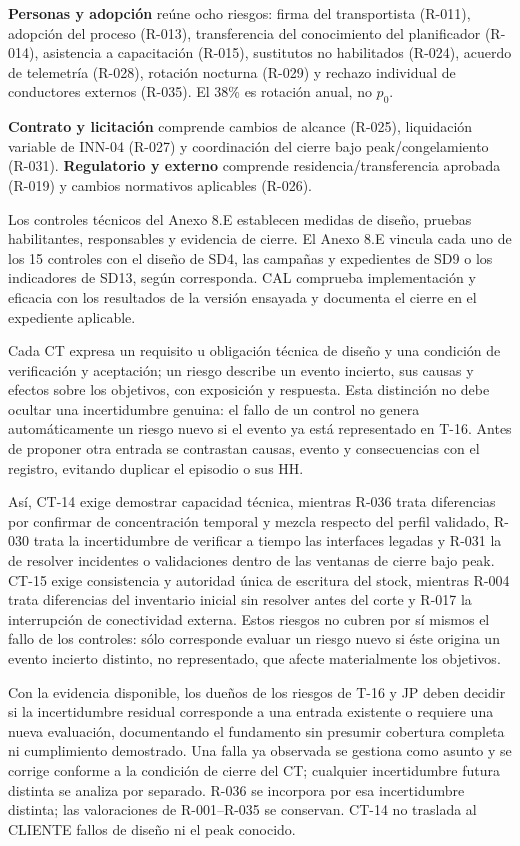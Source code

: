 \textbf{Personas y adopción} reúne ocho riesgos: firma del transportista (R-011), adopción del proceso (R-013), transferencia del conocimiento del planificador (R-014), asistencia a capacitación (R-015), sustitutos no habilitados (R-024), acuerdo de telemetría (R-028), rotación nocturna (R-029) y rechazo individual de conductores externos (R-035). El 38\% es rotación anual, no $p_0$.

\textbf{Contrato y licitación} comprende cambios de alcance (R-025), liquidación variable de INN-04 (R-027) y coordinación del cierre bajo peak/congelamiento (R-031). \textbf{Regulatorio y externo} comprende residencia/transferencia aprobada (R-019) y cambios normativos aplicables (R-026).

Los controles técnicos del Anexo 8.E establecen medidas de diseño, pruebas habilitantes, responsables y evidencia de cierre. El Anexo 8.E vincula cada uno de los 15 controles con el diseño de SD4, las campañas y expedientes de SD9 o los indicadores de SD13, según corresponda. CAL comprueba implementación y eficacia con los resultados de la versión ensayada y documenta el cierre en el expediente aplicable.

Cada CT expresa un requisito u obligación técnica de diseño y una condición de verificación y aceptación; un riesgo describe un evento incierto, sus causas y efectos sobre los objetivos, con exposición y respuesta. Esta distinción no debe ocultar una incertidumbre genuina: el fallo de un control no genera automáticamente un riesgo nuevo si el evento ya está representado en T-16. Antes de proponer otra entrada se contrastan causas, evento y consecuencias con el registro, evitando duplicar el episodio o sus HH.

Así, CT-14 exige demostrar capacidad técnica, mientras R-036 trata diferencias por confirmar de concentración temporal y mezcla respecto del perfil validado, R-030 trata la incertidumbre de verificar a tiempo las interfaces legadas y R-031 la de resolver incidentes o validaciones dentro de las ventanas de cierre bajo peak. CT-15 exige consistencia y autoridad única de escritura del stock, mientras R-004 trata diferencias del inventario inicial sin resolver antes del corte y R-017 la interrupción de conectividad externa. Estos riesgos no cubren por sí mismos el fallo de los controles: sólo corresponde evaluar un riesgo nuevo si éste origina un evento incierto distinto, no representado, que afecte materialmente los objetivos.

Con la evidencia disponible, los dueños de los riesgos de T-16 y JP deben decidir si la incertidumbre residual corresponde a una entrada existente o requiere una nueva evaluación, documentando el fundamento sin presumir cobertura completa ni cumplimiento demostrado. Una falla ya observada se gestiona como asunto y se corrige conforme a la condición de cierre del CT; cualquier incertidumbre futura distinta se analiza por separado. R-036 se incorpora por esa incertidumbre distinta; las valoraciones de R-001--R-035 se conservan. CT-14 no traslada al CLIENTE fallos de diseño ni el peak conocido.

